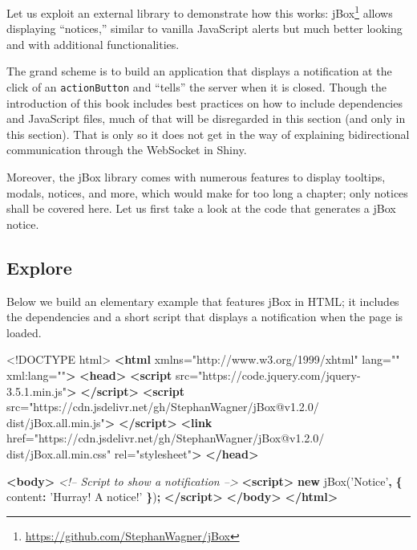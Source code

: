 \documentclass[10pt,]{krantz}
\makeatletter
\newenvironment{Shaded}{\begin{snugshade}}{\end{snugshade}}
\newcommand{\AttributeTok}[1]{\textcolor[rgb]{0.61,0.61,0.61}{#1}}
\newcommand{\CommentTok}[1]{\textcolor[rgb]{0.37,0.37,0.37}{\textit{#1}}}
\newcommand{\DataTypeTok}[1]{\textcolor[rgb]{0.27,0.27,0.27}{#1}}
\newcommand{\KeywordTok}[1]{\textcolor[rgb]{0.27,0.27,0.27}{\textbf{#1}}}
\newcommand{\NormalTok}[1]{#1}
\newcommand{\OperatorTok}[1]{\textcolor[rgb]{0.43,0.43,0.43}{\textbf{#1}}}
\newcommand{\OtherTok}[1]{\textcolor[rgb]{0.37,0.37,0.37}{#1}}
\newcommand{\StringTok}[1]{\textcolor[rgb]{0.5,0.5,0.5}{#1}}
\renewcommand{\href}[2]{#2\footnote{\url{#1}}}
\newenvironment{kframe}{%
\medskip{}
\setlength{\fboxsep}{.8em}
 \def\at@end@of@kframe{}%
 \ifinner\ifhmode%
  \def\at@end@of@kframe{\end{minipage}}%
  \begin{minipage}{\columnwidth}%
 \fi\fi%
 \def\FrameCommand##1{\hskip\@totalleftmargin \hskip-\fboxsep
 \colorbox{shadecolor}{##1}\hskip-\fboxsep
     \hskip-\linewidth \hskip-\@totalleftmargin \hskip\columnwidth}%
 \MakeFramed {\advance\hsize-\width
   \@totalleftmargin\z@ \linewidth\hsize
   \@setminipage}}%
 {\par\unskip\endMakeFramed%
 \at@end@of@kframe}
\renewenvironment{Shaded}{\begin{kframe}}{\end{kframe}}
\makeatother
\begin{document}
Let us exploit an external library to demonstrate how this works: \href{https://github.com/StephanWagner/jBox}{jBox} allows displaying ``notices,'' similar to vanilla JavaScript alerts but much better looking and with additional functionalities.

The grand scheme is to build an application that displays a notification at the click of an \texttt{actionButton} and ``tells'' the server when it is closed. Though the introduction of this book includes best practices on how to include dependencies and JavaScript files, much of that will be disregarded in this section (and only in this section). That is only so it does not get in the way of explaining bidirectional communication through the WebSocket in Shiny.

Moreover, the jBox library comes with numerous features to display tooltips, modals, notices, and more, which would make for too long a chapter; only notices shall be covered here. Let us first take a look at the code that generates a jBox notice.

\hypertarget{shiny-intro-explore}{%
\subsection{Explore}\label{shiny-intro-explore}}

Below we build an elementary example that features jBox in HTML; it includes the dependencies and a short script that displays a notification when the page is loaded.

\begin{Shaded}
\begin{Highlighting}[]
\DataTypeTok{<!DOCTYPE }\NormalTok{html}\DataTypeTok{>}
\KeywordTok{<html}\OtherTok{ xmlns=}\StringTok{"http://www.w3.org/1999/xhtml"}\OtherTok{ lang=}\StringTok{""}\OtherTok{ xml:lang=}\StringTok{""}\KeywordTok{>}
\KeywordTok{<head>}
\KeywordTok{<script} 
\OtherTok{  src=}\StringTok{"https://code.jquery.com/jquery-3.5.1.min.js"}\KeywordTok{>}
  \KeywordTok{</script>}
\KeywordTok{<script} 
\OtherTok{  src=}\StringTok{"https://cdn.jsdelivr.net/gh/StephanWagner/jBox@v1.2.0/}
\StringTok{    dist/jBox.all.min.js"}\KeywordTok{>}
\KeywordTok{</script>}
\KeywordTok{<link} 
\OtherTok{  href=}\StringTok{"https://cdn.jsdelivr.net/gh/StephanWagner/jBox@v1.2.0/}
\StringTok{    dist/jBox.all.min.css"} 
\OtherTok{  rel=}\StringTok{"stylesheet"}\KeywordTok{>}
\KeywordTok{</head>}

\KeywordTok{<body>}
  \CommentTok{<!-- Script to show a notification -->}
  \KeywordTok{<script>}
    \KeywordTok{new} \AttributeTok{jBox}\NormalTok{(}\StringTok{'Notice'}\OperatorTok{,} \OperatorTok{\{}
      \DataTypeTok{content}\OperatorTok{:} \StringTok{'Hurray! A notice!'}
    \OperatorTok{\}}\NormalTok{)}\OperatorTok{;}
  \KeywordTok{</script>}
\KeywordTok{</body>}
\KeywordTok{</html>}
\end{Highlighting}
\end{Shaded}
\end{document}
